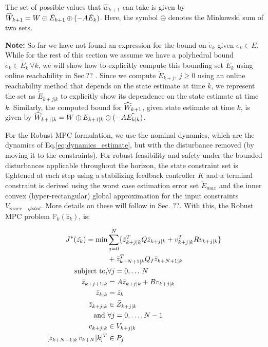 The set of possible values that $\hat{w}_{k+1}$ can take is given by $\widehat{W}_{k+1} = W\oplus\tilde{E}_{k+1}\oplus(-A\tilde{E}_k)$. Here, the symbol $\oplus$ denotes the Minkowski sum of two sets. 

\textbf{Note:} So far we have not found an expression for the bound on $\tilde{e}_k$ given $e_k \in E$. While for the rest of this section we assume we have a polyhedral bound $\tilde{e}_k \in \tilde{E}_k \, \forall k$, we will show how to explicitly compute this bounding set $\tilde{E}_k$ using online reachability in Sec.?? . Since we compute $\tilde{E}_{k+j},\, j\geq 0$ using an online reachability method that depends on the state estimate at time $k$, we represent the set as $\tilde{E}_{k+j|k}$ to explicitly show its dependence on the state estimate at time $k$. Similarly, the computed bound for $\widehat{W}_{k+1}$, given state estimate at time $k$, is given by $\widehat{W}_{k+1|k}=W\oplus{E}_{k+1|k}\oplus(-A\tilde{E_{k|k}})$. 

For the Robust MPC formulation, we use the nominal dynamics, which are the dynamics of Eq.\ref{eq:dynamics_estimate}, but with the disturbance removed (by moving it to the constraints). For robust feasibility and safety under the bounded disturbances applicable throughout the horizon, the state constraint set is tightened at each step using a stabilizing feedback controller $K$ and a terminal constraint is derived using the worst case estimation error set $\tilde{E}_{max}$ and the inner convex (hyper-rectangular) global approximation for the input constraints $V_{inner-global}$. More details on these will follow in Sec. ??.
With this, the Robust MPC problem $\mathbb{P}_k(\hat{z}_k)$, is:

\begin{subequations} \label{eq:RMPC}
	\label{eq:linear mpc}
\begin{align}
J^{*}(\hat{z_k}) = \text{min} &\sum_{j=0}^{N}\lbrace\bar{z}_{k+j|k}^{T}Q\bar{z}_{k+j|k} + {v}_{k+j|k}^{T}R{v}_{k+j|k}\rbrace \nonumber \\ 
&+ \bar{z}_{k+N+1|k}^{T}Q_f\bar{z}_{k+N+1|k} \label{eq:cost} \\
\text{subject to,} &\forall j=0,\dotsc\,N \nonumber \\
\bar{z}_{k+j+1|k}&=A\bar{z}_{k+j|k} + Bv_{k+j|k} \label{eq:nom_dyn} \\
\bar{z}_{k|k} &= \hat{z}_{k} \label{eq:init_cond}\\
\bar{z}_{k+j|k}& \in \bar{Z}_{k+j|k} \label{eq:states_con}\\
\text{and } &\forall j=0,\dotsc,N-1 \nonumber \\
v_{k+j|k} & \in V_{k+j|k} \label{eq:input_con} \\
[z_{k+N+1|k} \, v_{k+N}|k]^{T} & \in P_f \label{eq:joint_term} 
\end{align}
\end{subequations}

